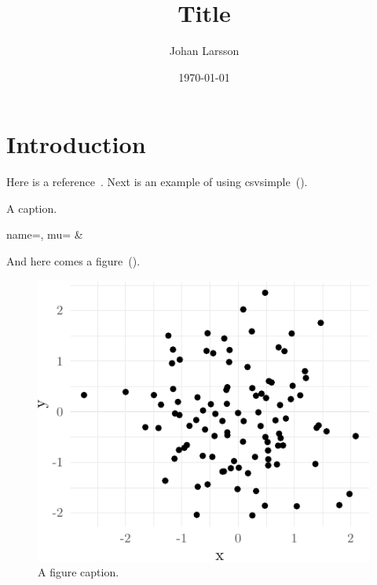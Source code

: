 \documentclass[english,a4paper]{article}
\title{Title}
\author{Johan Larsson}
\affil{The Department of Statistics, Lund University}
\date{\today}
\begin{document}
\maketitle

\begin{abstract}
\end{abstract}

\section{Introduction}
\label{introduction}

Here is a reference~\parencite{larsson2020c}. Next is an example of using
csvsimple~().

\begin{table}[hbtp]
	\caption{A caption.}
	\label{tab:table1}
	{name=\name, mu=\mu}%
	{\name & \mu}
\end{table}

And here comes a figure~().

\begin{figure}[hbtp]
	\centering
	\includegraphics{figures/plot.pdf}
	\caption{A figure caption.}
	\label{fig:figure1}
\end{figure}

\printbibliography
\end{document}
